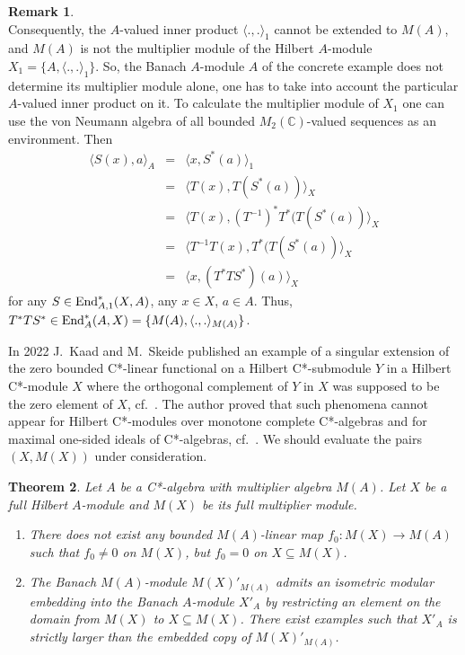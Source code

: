 \documentclass{amsart}
\newtheorem{thm}{Theorem}[section]
\theoremstyle{definition}
\newtheorem{rmk}[thm]{Remark}
\begin{document}
\begin{rmk}
\[ \]
Consequently, the $A$-valued inner product $\langle .,. \rangle_1$ cannot be extended to $M(A)$, and $M(A)$ is not the multiplier module of the Hilbert $A$-module  $X_1=\{ A, \langle .,. \rangle_1\}$. So, the Banach $A$-module $A$ of the concrete example does not determine its multiplier module alone, one has to take into account the particular $A$-valued inner product on it.  
To calculate the multiplier module of $X_1$ one can use the von Neumann algebra of all  bounded $M_2({\mathbb C})$-valued sequences as an environment. Then
\begin{eqnarray*}
   \langle S(x),a \rangle_A & = & \langle x, S^*(a) \rangle_1 \\
                                      & = & \langle T(x), T(S^*(a)) \rangle_X \\
                                      & = & \langle T(x), (T^{-1})^*T^* (T(S^*(a)) \rangle_X \\
                                      & = & \langle T^{-1}T(x), T^* (T(S^*(a)) \rangle_X \\
                                      & = & \langle x, (T^*TS^*)(a) \rangle_X 
\end{eqnarray*}
for any $S \in {\rm End}_{A,1}^*(X,A)$, any $x \in X$, $a \in A$. Thus, $T^*TS^* \in {\rm End}_{A}^*(A,X) = \{ M(A), \langle .,. \rangle_{M(A)} \}$. 
\end{rmk}

In 2022 J.~Kaad and M.~Skeide published an example of a singular extension of the zero bounded C*-linear functional on a Hilbert C*-submodule $Y$ in a Hilbert C*-module $X$ where the orthogonal complement of $Y$ in $X$ was supposed to be the zero element of $X$, cf.~\cite{KS}. The author proved that such phenomena cannot appear for Hilbert C*-modules over monotone complete C*-algebras and for maximal one-sided ideals of C*-algebras, cf.~\cite{F_2024}. We should evaluate the pairs $(X,M(X))$ under consideration.

\begin{thm} \label{funct}
Let $A$ be a C*-algebra with multiplier algebra $M(A)$. Let $X$ be a full Hilbert $A$-module and $M(X)$ be its full multiplier module.
\begin{enumerate}
  \item There does not exist any bounded $M(A)$-linear map $f_0: M(X) \to M(A)$ such that $f_0 \neq 0$ on $M(X)$, but $f_0 =0$ on $X \subseteq M(X)$.
  \item The Banach $M(A)$-module $M(X)'_{M(A)}$ admits an isometric modular embedding into the Banach $A$-module $X'_A$ by restricting an element on the domain from $M(X)$ to $X\subseteq M(X)$. There exist examples such that $X'_A$ is strictly larger than the embedded copy of $M(X)'_{M(A)}$.
\end{enumerate}
\end{thm}
\end{document}
